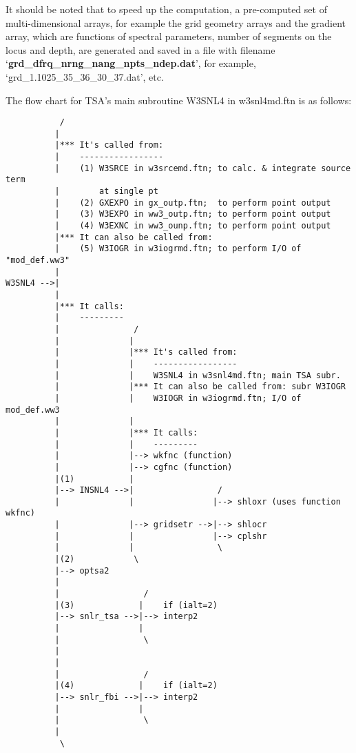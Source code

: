 It should be noted that to speed up the computation, a pre-computed set of multi-dimensional arrays, for example the grid geometry arrays and the gradient array, which are functions of spectral parameters, number of segments on the locus and depth, are generated and saved in a file with filename `\textbf{grd\_dfrq\_nrng\_nang\_npts\_ndep.dat}', for example, `grd\-\_1.1025\-\_35\-\_36\-\_30\-\_37\-.dat', etc.

The flow chart for TSA's main subroutine W3SNL4 in w3snl4md.ftn is as follows:
{\footnotesize 
\begin{verbatim}
           /
          |
          |*** It's called from:
          |    -----------------
          |    (1) W3SRCE in w3srcemd.ftn; to calc. & integrate source term 
          |        at single pt
          |    (2) GXEXPO in gx_outp.ftn;  to perform point output
          |    (3) W3EXPO in ww3_outp.ftn; to perform point output
          |    (4) W3EXNC in ww3_ounp.ftn; to perform point output
          |*** It can also be called from:
          |    (5) W3IOGR in w3iogrmd.ftn; to perform I/O of "mod_def.ww3"
          |
W3SNL4 -->| 
          |
          |*** It calls:
          |    ---------
          |               /
          |              |
          |              |*** It's called from:
          |              |    -----------------
          |              |    W3SNL4 in w3snl4md.ftn; main TSA subr.
          |              |*** It can also be called from: subr W3IOGR
          |              |    W3IOGR in w3iogrmd.ftn; I/O of mod_def.ww3
          |              |
          |              |*** It calls:
          |              |    ---------
          |              |--> wkfnc (function)
          |              |--> cgfnc (function)
          |(1)           |
          |--> INSNL4 -->|                 /
          |              |                |--> shloxr (uses function wkfnc)
          |              |--> gridsetr -->|--> shlocr
          |              |                |--> cplshr
          |              |                 \
          |(2)            \
          |--> optsa2
          |
          |                 /
          |(3)             |    if (ialt=2)
          |--> snlr_tsa -->|--> interp2
          |                |
          |                 \
          |
          |
          |                 /
          |(4)             |    if (ialt=2)
          |--> snlr_fbi -->|--> interp2
          |                |
          |                 \
          |
           \ 
\end{verbatim}
 }
